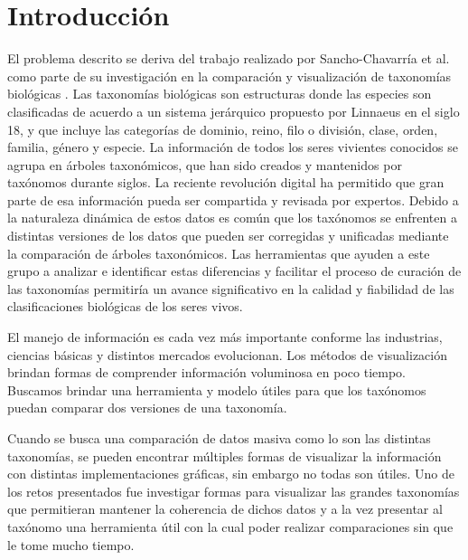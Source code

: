\documentclass[journal]{IEEEtran}
\begin{document}
\section{Introducción}
% 
% 
% 
% 
El problema descrito se deriva del trabajo realizado por 
Sancho-Chavarría et al. como parte  de su  investigación en la comparación
y visualización de taxonomías biológicas \cite{sancho_diafora}.
Las taxonomías biológicas son estructuras donde las especies son clasificadas de
 acuerdo a un sistema jerárquico propuesto por Linnaeus en el siglo 18\cite{linne},
  y que incluye las categorías de dominio, reino, filo o división, clase, orden,
   familia, género y especie.
La información de todos los seres vivientes conocidos se agrupa en
 árboles taxonómicos, que han sido creados y mantenidos por taxónomos durante siglos. La reciente revolución digital ha permitido que gran parte 
 de esa información pueda  ser compartida y revisada por expertos.  
 Debido a la naturaleza dinámica de estos datos es común que los taxónomos se 
 enfrenten a distintas versiones de los datos que pueden ser corregidas y unificadas
  mediante la comparación de árboles taxonómicos. Las herramientas que ayuden a este 
  grupo a analizar e identificar estas diferencias y facilitar el proceso de curación 
  de las taxonomías permitiría un avance significativo en la calidad y fiabilidad de
   las clasificaciones biológicas de los seres vivos.
   
El manejo de información es cada vez más importante conforme las industrias, ciencias básicas y distintos mercados evolucionan. Los métodos de visualización brindan formas de comprender información voluminosa en poco tiempo.
Buscamos brindar una herramienta y modelo útiles para que los taxónomos puedan comparar dos versiones de una taxonomía.
   
Cuando se busca una comparación de datos masiva como lo son las distintas taxonomías, se pueden encontrar múltiples formas de visualizar la información con distintas implementaciones gráficas, sin embargo no todas son útiles. Uno de los retos presentados fue investigar formas para visualizar las grandes taxonomías que permitieran mantener la coherencia de dichos datos y a la vez presentar al taxónomo una herramienta útil con la cual poder realizar comparaciones sin que le tome mucho tiempo.
\end{document}
